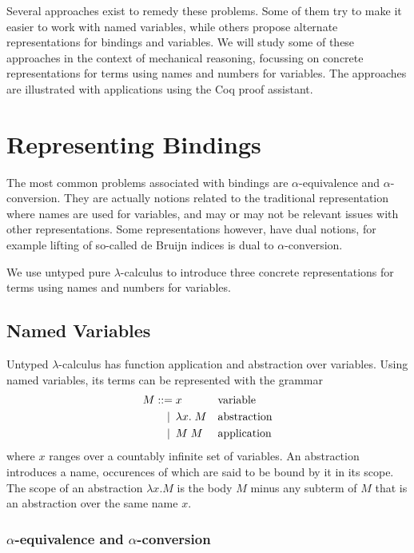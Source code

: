 \documentclass[a4paper,11pt]{article}
\begin{document}
Several approaches exist to remedy these problems.
Some of them try to make it easier to work with named variables, while
others propose alternate representations for bindings and variables.
We will study some of these approaches in the context of mechanical
reasoning, focussing on concrete representations for terms using names
and numbers for variables.
The approaches are illustrated with applications using the Coq proof
assistant.


\section{Representing Bindings}\label{sec:representing}

The most common problems associated with bindings are $\alpha$-equivalence
and $\alpha$-conversion.
They are actually notions related to the traditional representation where
names are used for variables, and may or may not be relevant issues with
other representations.
Some representations however, have dual notions, for example lifting of
so-called de Bruijn indices is dual to $\alpha$-conversion.

We use untyped pure $\lambda$-calculus to introduce three concrete
representations for terms using names and numbers for variables.


\subsection{Named Variables}

Untyped $\lambda$-calculus has function application and abstraction over
variables. Using named variables, its terms can be represented with the
grammar
\begin{align*}
  M ::=             &\; x
  && \text{variable} \\
  \llap{\textbar\:} &\; \lambda x. \; M
  && \text{abstraction} \\
  \llap{\textbar\:} &\; M \; M
  && \text{application}
\end{align*}
where $x$ ranges over a countably infinite set of variables.
An abstraction introduces a name, occurences of which are said to be
bound by it in its scope. The scope of an abstraction $\lambda x.M$ is
the body $M$ minus any subterm of $M$ that is an abstraction over the
same name $x$.

\subsubsection*{$\alpha$-equivalence and $\alpha$-conversion}
\end{document}
